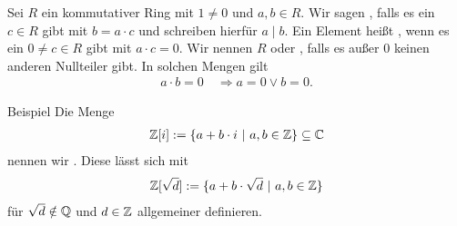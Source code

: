 \begin{df}\label{skript:7.4}
	Sei $ R $ ein kommutativer Ring mit $ 1 \neq 0 $ und $ a,b \in R $.
	Wir sagen , falls es ein $ c \in R $ gibt
	mit $ b = a \cdot c $ und schreiben hierfür $ a \mid b $.
	Ein Element heißt ,
	wenn es ein $  0 \neq c \in R $ gibt mit $ a \cdot c = 0 $.
	Wir nennen $ R $  oder , falls es außer $ 0 $ keinen anderen Nullteiler gibt. In solchen Mengen gilt
	\begin{align*}
	a \cdot b = 0 \quad \Rightarrow a= 0 \vee b = 0.
	\end{align*}
\end{df}

\begin{genericdf}{Beispiel}\label{skript:7.5}
	Die Menge
	\begin{align*}
	\mathbb{Z}[i] := \lbrace a + b \cdot i \ | \ a,b \in \mathbb{Z} \rbrace \subseteq \mathbb{C} 
	\end{align*}
	nennen wir .
	Diese lässt sich mit 
	\begin{align*}
	\mathbb{Z}[\sqrt{d}] := \lbrace a + b \cdot \sqrt{d} \ | \ a,b \in \mathbb{Z} \rbrace
	\end{align*}
	für $ \sqrt{d} \notin \mathbb{Q} $ und $ d \in \mathbb{Z} $ allgemeiner definieren.
\end{genericdf}

